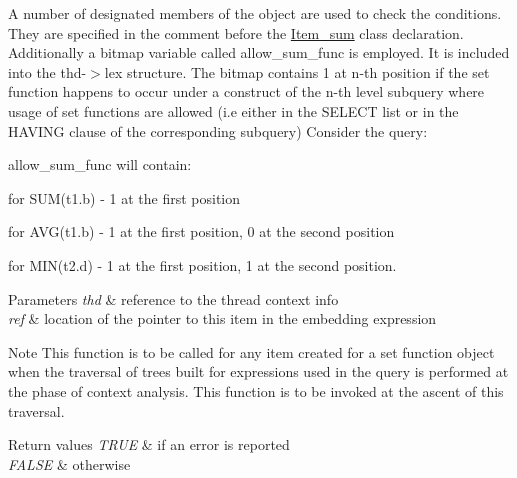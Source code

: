 A number of designated members of the object are used to check the conditions. They are specified in the comment before the \mbox{\hyperlink{classItem__sum}{Item\+\_\+sum}} class declaration. Additionally a bitmap variable called allow\+\_\+sum\+\_\+func is employed. It is included into the thd-\/$>$lex structure. The bitmap contains 1 at n-\/th position if the set function happens to occur under a construct of the n-\/th level subquery where usage of set functions are allowed (i.\+e either in the S\+E\+L\+E\+CT list or in the H\+A\+V\+I\+NG clause of the corresponding subquery) Consider the query\+: 
\begin{DoxyCode}{0}
\end{DoxyCode}
 allow\+\_\+sum\+\_\+func will contain\+:
\begin{DoxyItemize}
\item for S\+UM(t1.\+b) -\/ 1 at the first position
\item for A\+VG(t1.\+b) -\/ 1 at the first position, 0 at the second position
\item for M\+IN(t2.\+d) -\/ 1 at the first position, 1 at the second position.
\end{DoxyItemize}


\begin{DoxyParams}{Parameters}
{\em thd} & reference to the thread context info \\
\hline
{\em ref} & location of the pointer to this item in the embedding expression\\
\hline
\end{DoxyParams}
\begin{DoxyNote}{Note}
This function is to be called for any item created for a set function object when the traversal of trees built for expressions used in the query is performed at the phase of context analysis. This function is to be invoked at the ascent of this traversal.
\end{DoxyNote}

\begin{DoxyRetVals}{Return values}
{\em T\+R\+UE} & if an error is reported \\
\hline
{\em F\+A\+L\+SE} & otherwise \\
\hline
\end{DoxyRetVals}
\mbox{\label{classItem__sum_a838d698110f5c45d6ad3ba1c6e5b2a95}} 
